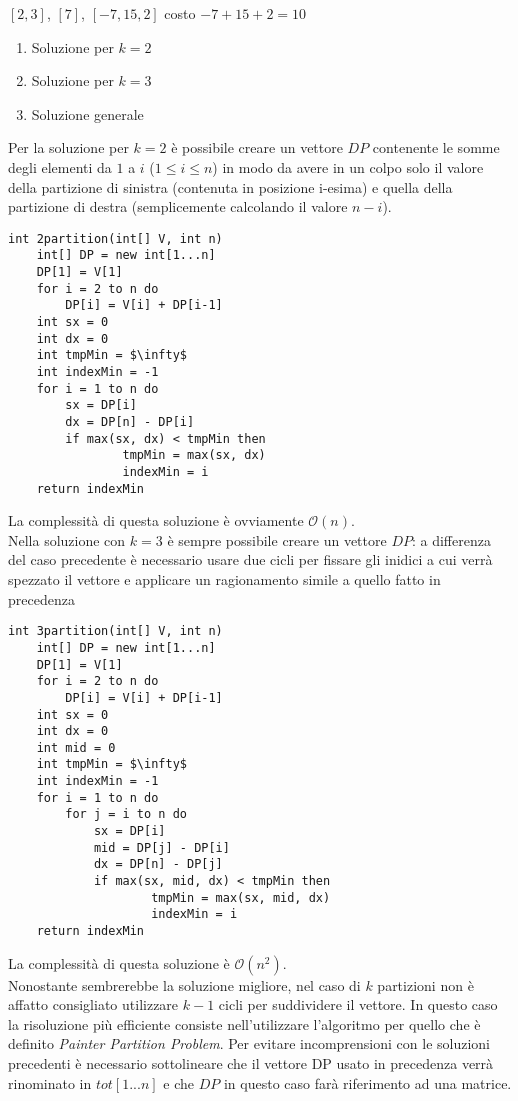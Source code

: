 \documentclass[../cheatSheetAlgoritmi.tex]{subfiles}
\begin{document}
$[2,3]$, $[7]$, $[-7,15,2]$	costo $- 7 + 15 + 2 = 10$
\begin{enumerate}
	\item Soluzione per $k= 2$
	\item Soluzione per $k= 3$
	\item Soluzione generale
\end{enumerate}
Per la soluzione per $k = 2$ è possibile creare un vettore $DP$ contenente le somme degli elementi da $1$ a $i$ ($1 \leq i \leq n$) in modo da avere in un colpo solo il valore della partizione di sinistra (contenuta in posizione i-esima) e quella della partizione di destra (semplicemente calcolando il valore $n - i$).
\begin{lstlisting}[caption=2-partizioni]
int 2partition(int[] V, int n)
	int[] DP = new int[1...n]
	DP[1] = V[1]
	for i = 2 to n do
		DP[i] = V[i] + DP[i-1]
	int sx = 0
	int dx = 0
	int tmpMin = $\infty$
	int indexMin = -1
	for i = 1 to n do
		sx = DP[i]
		dx = DP[n] - DP[i]
		if max(sx, dx) < tmpMin then
				tmpMin = max(sx, dx)
				indexMin = i
	return indexMin
\end{lstlisting}
La complessità di questa soluzione è ovviamente $\mathcal{O}(n)$.\\
Nella soluzione con $k=3$ è sempre possibile creare un vettore $DP$: a differenza del caso precedente è necessario usare due cicli per fissare gli inidici a cui verrà spezzato il vettore e applicare un ragionamento simile a quello fatto in precedenza
\begin{lstlisting}[caption=3-partizioni]
int 3partition(int[] V, int n)
	int[] DP = new int[1...n]
	DP[1] = V[1]
	for i = 2 to n do
		DP[i] = V[i] + DP[i-1]
	int sx = 0
	int dx = 0
	int mid = 0
	int tmpMin = $\infty$
	int indexMin = -1
	for i = 1 to n do
		for j = i to n do
			sx = DP[i]
			mid = DP[j] - DP[i]
			dx = DP[n] - DP[j]
			if max(sx, mid, dx) < tmpMin then
					tmpMin = max(sx, mid, dx)
					indexMin = i
	return indexMin
\end{lstlisting}
La complessità di questa soluzione è $\mathcal{O}(n^{2})$.\\
Nonostante sembrerebbe la soluzione migliore, nel caso di $k$ partizioni non è affatto consigliato utilizzare $k-1$ cicli per suddividere il vettore. In questo caso la risoluzione più efficiente consiste nell'utilizzare l'algoritmo per quello che è definito \emph{Painter Partition Problem}. Per evitare incomprensioni con le soluzioni precedenti è necessario sottolineare che il vettore DP usato in precedenza verrà rinominato in $tot[1...n]$ e che $DP$ in questo caso farà riferimento ad una matrice.\\
\end{document}
